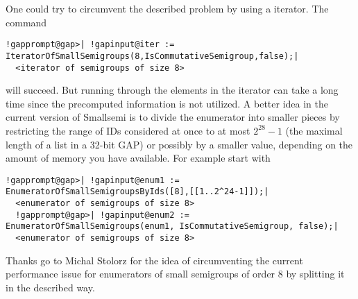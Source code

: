 \documentclass[a4paper,11pt]{report}
\begin{document}
{{{ One could try to circumvent the described problem by using a iterator. The
command 
\begin{Verbatim}[commandchars=!@|,fontsize=\small,frame=single,label=Example]
  !gapprompt@gap>| !gapinput@iter := IteratorOfSmallSemigroups(8,IsCommutativeSemigroup,false);|
  <iterator of semigroups of size 8>
\end{Verbatim}
 will succeed. But running through the elements in the iterator can take a long
time since the precomputed information is not utilized. A better idea in the
current version of \textsf{Smallsemi} is to divide the enumerator into smaller pieces by restricting the range of
IDs considered at once to at most $2^{28}-1$ (the maximal length of a list in a 32-bit \textsf{GAP}) or possibly by a smaller value, depending on the amount of memory you have
available. For example start with 
\begin{Verbatim}[commandchars=!@|,fontsize=\small,frame=single,label=Example]
  !gapprompt@gap>| !gapinput@enum1 := EnumeratorOfSmallSemigroupsByIds([8],[[1..2^24-1]]);|
  <enumerator of semigroups of size 8>
  !gapprompt@gap>| !gapinput@enum2 := EnumeratorOfSmallSemigroups(enum1, IsCommutativeSemigroup, false);|
  <enumerator of semigroups of size 8>
\end{Verbatim}
 Thanks go to Michal Stolorz for the idea of circumventing the current
performance issue for enumerators of small semigroups of order 8 by splitting
it in the described way. }

 }

 
}
\end{document}
